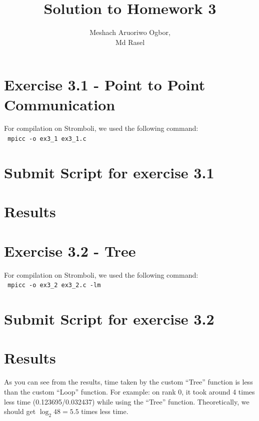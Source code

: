 \documentclass[11pt]{article}
\begin{document}
\title{Solution to Homework 3}

\author{
   Meshach Aruoriwo Ogbor,\\
   Md Rasel}

\maketitle

\section{Exercise 3.1 - Point to Point Communication}

For compilation on Stromboli, we used the following command: \\
\verb+ mpicc -o ex3_1 ex3_1.c+
\newpage

\section{Submit Script for exercise 3.1}

\section{Results}



\newpage
\section{Exercise 3.2 - Tree}

For compilation on Stromboli, we used the following command: \\
\verb+ mpicc -o ex3_2 ex3_2.c -lm+ 
\newpage

\section{Submit Script for exercise 3.2}

\section{Results}

As you can see from the results, time taken by the custom ``Tree'' function is less than the custom ``Loop'' function. For example: on rank 0, it took around 4 times less time (0.123695/0.032437) while using the ``Tree'' function. Theoretically, we should get $\log_2 48 = 5.5$ times less time. 
\end{document}
